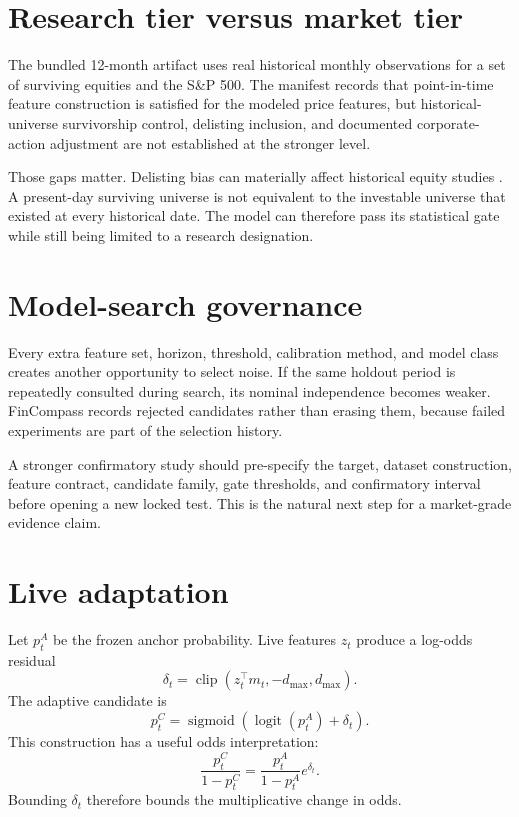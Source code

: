 \documentclass[11pt]{article}
\newcommand{\sigmoid}{\operatorname{sigmoid}}
\newcommand{\logit}{\operatorname{logit}}
\begin{document}
\section{Research tier versus market tier}

The bundled 12-month artifact uses real historical monthly observations for a set of surviving equities and the S\&P 500. The manifest records that point-in-time feature construction is satisfied for the modeled price features, but historical-universe survivorship control, delisting inclusion, and documented corporate-action adjustment are not established at the stronger level.

Those gaps matter. Delisting bias can materially affect historical equity studies \citep{shumway1997delisting}. A present-day surviving universe is not equivalent to the investable universe that existed at every historical date. The model can therefore pass its statistical gate while still being limited to a research designation.

\section{Model-search governance}

Every extra feature set, horizon, threshold, calibration method, and model class creates another opportunity to select noise. If the same holdout period is repeatedly consulted during search, its nominal independence becomes weaker. FinCompass records rejected candidates rather than erasing them, because failed experiments are part of the selection history.

A stronger confirmatory study should pre-specify the target, dataset construction, feature contract, candidate family, gate thresholds, and confirmatory interval before opening a new locked test. This is the natural next step for a market-grade evidence claim.

\section{Live adaptation}

Let $p_t^A$ be the frozen anchor probability. Live features $z_t$ produce a log-odds residual
\begin{equation}
\delta_t=\operatorname{clip}(z_t^\top m_t,-d_{\max},d_{\max}).
\end{equation}
The adaptive candidate is
\begin{equation}
p_t^C=\sigmoid\left(\logit(p_t^A)+\delta_t\right).
\end{equation}
This construction has a useful odds interpretation:
\begin{equation}
\frac{p_t^C}{1-p_t^C}=\frac{p_t^A}{1-p_t^A}e^{\delta_t}.
\end{equation}
Bounding $\delta_t$ therefore bounds the multiplicative change in odds.
\end{document}
